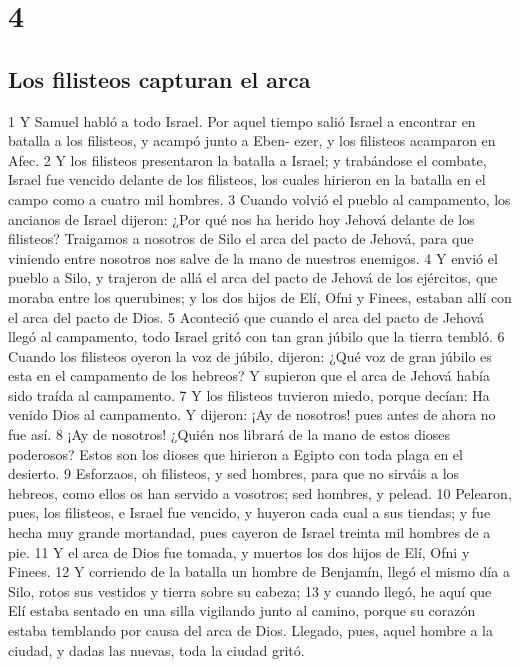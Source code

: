 \chapter{4}

\section*{Los filisteos capturan el arca}


1 Y Samuel habló a todo Israel. Por aquel tiempo salió Israel a encontrar en batalla a los filisteos, y acampó junto a Eben- ezer, y los filisteos acamparon en Afec.
2 Y los filisteos presentaron la batalla a Israel; y trabándose el combate, Israel fue vencido delante de los filisteos, los cuales hirieron en la batalla en el campo como a cuatro mil hombres.
3 Cuando volvió el pueblo al campamento, los ancianos de Israel dijeron: ¿Por qué nos ha herido hoy Jehová delante de los filisteos? Traigamos a nosotros de Silo el arca del pacto de Jehová, para que viniendo entre nosotros nos salve de la mano de nuestros enemigos.
4 Y envió el pueblo a Silo, y trajeron de allá el arca del pacto de Jehová de los ejércitos, que moraba entre los querubines; y los dos hijos de Elí, Ofni y Finees, estaban allí con el arca del pacto de Dios. 
5 Aconteció que cuando el arca del pacto de Jehová llegó al campamento, todo Israel gritó con tan gran júbilo que la tierra tembló.
6 Cuando los filisteos oyeron la voz de júbilo, dijeron: ¿Qué voz de gran júbilo es esta en el campamento de los hebreos? Y supieron que el arca de Jehová había sido traída al campamento.
7 Y los filisteos tuvieron miedo, porque decían: Ha venido Dios al campamento. Y dijeron: ¡Ay de nosotros! pues antes de ahora no fue así.
8 ¡Ay de nosotros! ¿Quién nos librará de la mano de estos dioses poderosos? Estos son los dioses que hirieron a Egipto con toda plaga en el desierto.
9 Esforzaos, oh filisteos, y sed hombres, para que no sirváis a los hebreos, como ellos os han servido a vosotros; sed hombres, y pelead.
10 Pelearon, pues, los filisteos, e Israel fue vencido, y huyeron cada cual a sus tiendas; y fue hecha muy grande mortandad, pues cayeron de Israel treinta mil hombres de a pie.
11 Y el arca de Dios fue tomada, y muertos los dos hijos de Elí, Ofni y Finees.
12 Y corriendo de la batalla un hombre de Benjamín, llegó el mismo día a Silo, rotos sus vestidos y tierra sobre su cabeza;
13 y cuando llegó, he aquí que Elí estaba sentado en una silla vigilando junto al camino, porque su corazón estaba temblando por causa del arca de Dios. Llegado, pues, aquel hombre a la ciudad, y dadas las nuevas, toda la ciudad gritó.
